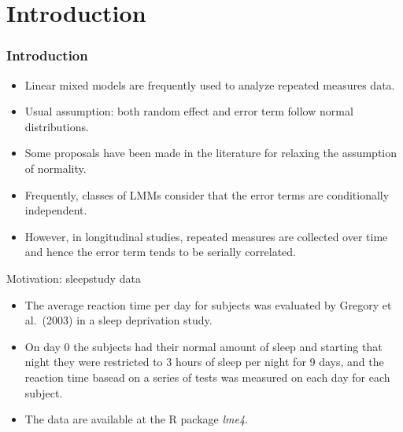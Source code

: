 \section{Introduction}

\begin{frame}
\frametitle{Introduction}
\begin{itemize}
\item Linear mixed models are frequently used to analyze repeated measures data.
\vfill\item Usual assumption: both random effect and error term follow normal
distributions. 
\vfill\item Some proposals have been made in the literature for relaxing the assumption of normality. \pause
\vfill\item Frequently, classes of LMMs consider that the error terms are conditionally independent. 
\vfill\item However, in longitudinal studies, repeated measures are collected over time and hence the error term tends to be serially correlated.
\end{itemize}
\end{frame}

\begin{frame}{Motivation: sleepstudy data}
\protect\hypertarget{motivation-sleepstudy-data}{}

\begin{itemize}
\tightlist
\item
  The average reaction time per day for subjects was evaluated by
  Gregory et al.~(2003) in a sleep deprivation study.
\vfill\item
  On day 0 the subjects had their normal amount of sleep and starting
  that night they were restricted to 3 hours of sleep per night for 9
  days, and the reaction time basead on a series of tests was measured
  on each day for each subject.
\vfill\item
  The data are available at the R package \emph{lme4}.
\end{itemize}

\end{frame}

